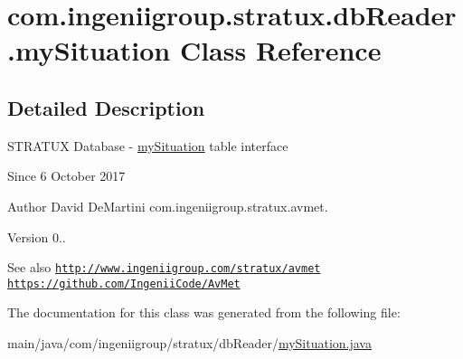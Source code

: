 \hypertarget{classcom_1_1ingeniigroup_1_1stratux_1_1db_reader_1_1my_situation}{}\section{com.\+ingeniigroup.\+stratux.\+db\+Reader.\+my\+Situation Class Reference}
\label{classcom_1_1ingeniigroup_1_1stratux_1_1db_reader_1_1my_situation}


\subsection{Detailed Description}
S\+T\+R\+A\+T\+UX Database -\/ \hyperlink{classcom_1_1ingeniigroup_1_1stratux_1_1db_reader_1_1my_situation}{my\+Situation} table interface

\begin{DoxySince}{Since}
6 October 2017 
\end{DoxySince}
\begin{DoxyAuthor}{Author}
David De\+Martini  com.\+ingeniigroup.\+stratux.\+avmet. 
\end{DoxyAuthor}
\begin{DoxyVersion}{Version}
0.. 
\end{DoxyVersion}
\begin{DoxySeeAlso}{See also}
\href{http://www.ingeniigroup.com/stratux/avmet}{\tt http\+://www.\+ingeniigroup.\+com/stratux/avmet}  \href{https://github.com/IngeniiCode/AvMet}{\tt https\+://github.\+com/\+Ingenii\+Code/\+Av\+Met} 
\end{DoxySeeAlso}


The documentation for this class was generated from the following file\+:\begin{DoxyCompactItemize}
\item 
main/java/com/ingeniigroup/stratux/db\+Reader/\hyperlink{my_situation_8java}{my\+Situation.\+java}\end{DoxyCompactItemize}
